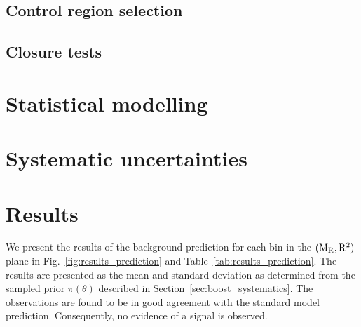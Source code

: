 

\subsection{Control region selection \label{sec:boost_control_selection}}



\subsection{Closure tests \label{sec:boost_closure_tests}}




\section{Statistical modelling \label{sec:boost_likelihood}}





\section{Systematic uncertainties \label{sec:boost_systematics}}





\section{Results \label{sec:boost_results}}

We present the results of the background prediction for each bin in the $(\mathrm{M_R},\mathrm{R^2})$ plane in
Fig.~\ref{fig:results_prediction} and Table~\ref{tab:results_prediction}. The results are presented
as the mean and standard deviation as determined from the sampled prior $\pi(\theta)$
described in Section~\ref{sec:boost_systematics}.  
The observations are found to be in good agreement with the standard model prediction. Consequently,
no evidence of a signal is observed. 

